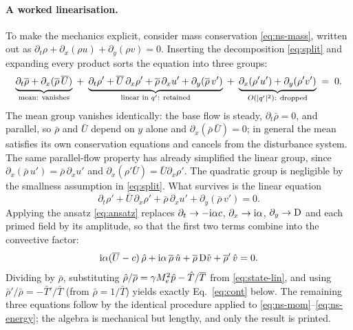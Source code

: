 \documentclass[11pt]{article}
\begin{document}
\paragraph{A worked linearisation.} To make the mechanics explicit, consider mass conservation
\eqref{eq:ns-mass}, written out as $\partial_t\rho+\partial_x(\rho u)+\partial_y(\rho v)=0$.
Inserting the decomposition \eqref{eq:split} and expanding every product sorts the equation into
three groups:
\begin{equation}\label{eq:lin-groups}
  \underbrace{\vphantom{\partial_y(\bar\rho v')}\partial_t\bar\rho
      +\partial_x(\bar\rho\,\bar U)}_{\text{mean: vanishes}}
  \;+\;\underbrace{\partial_t\rho'+\bar U\,\partial_x\rho'
      +\bar\rho\,\partial_x u'+\partial_y(\bar\rho\,v')}_{\text{linear in }q'\text{: retained}}
  \;+\;\underbrace{\vphantom{\partial_y(\bar\rho v')}\partial_x(\rho'u')
      +\partial_y(\rho'v')}_{O(|q'|^2)\text{: dropped}}
  \;=\;0 .
\end{equation}
The mean group vanishes identically: the base flow is steady, $\partial_t\bar\rho=0$, and parallel,
so $\bar\rho$ and $\bar U$ depend on $y$ alone and $\partial_x(\bar\rho\,\bar U)=0$; in general the
mean satisfies its own conservation equations and cancels from the disturbance system. The same
parallel-flow property has already simplified the linear group, since
$\partial_x(\bar\rho\,u')=\bar\rho\,\partial_xu'$ and $\partial_x(\rho'\bar U)=\bar U\partial_x\rho'$.
The quadratic group is negligible by the smallness assumption in \eqref{eq:split}. What survives is
the linear equation
\begin{equation}\label{eq:cont-lin}
  \partial_t\rho'+\bar U\,\partial_x\rho'+\bar\rho\,\partial_x u'+\partial_y(\bar\rho\,v')=0 .
\end{equation}
Applying the ansatz \eqref{eq:ansatz} replaces $\partial_t\to-\mathrm{i}\alpha c$,
$\partial_x\to\mathrm{i}\alpha$, $\partial_y\to\mathrm{D}$ and each primed field by its amplitude, so that the
first two terms combine into the convective factor:
\begin{equation}\label{eq:cont-ansatz}
  \mathrm{i}\alpha(\overline{U}-c)\,\hat\rho+\mathrm{i}\alpha\,\overline{\rho}\,\hat{u}
   +\overline{\rho}\,\mathrm{D}\hat{v}+\overline{\rho}'\,\hat{v}=0 .
\end{equation}
Dividing by $\bar\rho$, substituting $\hat\rho/\overline{\rho}=\gamma M_e^2\hat{p}-\hat{T}/\overline{T}$ from
\eqref{eq:state-lin}, and using $\bar\rho'/\bar\rho=-\bar T'/\bar T$ (from $\bar\rho=1/\bar T$)
yields exactly Eq.~\eqref{eq:cont} below. The remaining three equations follow by the identical
procedure applied to \eqref{eq:ns-mom}--\eqref{eq:ns-energy}; the algebra is mechanical but lengthy,
and only the result is printed.
\end{document}

